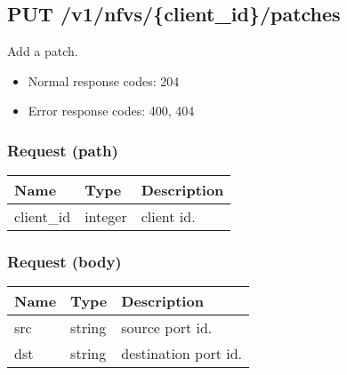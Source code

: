 \documentclass[a4paper,11pt,openany,oneside,english]{sphinxmanual}
\begin{document}
\subsection{PUT /v1/nfvs/\{client\_id\}/patches}
\label{\detokenize{api_ref/spp_nfv:put-v1-nfvs-client-id-patches}}
Add a patch.
\begin{itemize}
\item {} 
Normal response codes: 204

\item {} 
Error response codes: 400, 404

\end{itemize}


\subsubsection{Request (path)}
\label{\detokenize{api_ref/spp_nfv:id10}}

\begin{savenotes}\sphinxattablestart
\centering
{}
\sphinxthecaptionisattop
{}\label{\detokenize{api_ref/spp_nfv:id30}}\label{\detokenize{api_ref/spp_nfv:table-spp-ctl-spp-nfv-patches-get}}
\sphinxaftertopcaption
\begin{tabulary}{\linewidth}[t]{|T|T|T|}
\hline
\sphinxstyletheadfamily 
Name
&\sphinxstyletheadfamily 
Type
&\sphinxstyletheadfamily 
Description
\\
\hline
client\_id
&
integer
&
client id.
\\
\hline
\end{tabulary}
\par
\sphinxattableend\end{savenotes}


\subsubsection{Request (body)}
\label{\detokenize{api_ref/spp_nfv:id11}}

\begin{savenotes}\sphinxattablestart
\centering
{}
\sphinxthecaptionisattop
{}\label{\detokenize{api_ref/spp_nfv:id31}}\label{\detokenize{api_ref/spp_nfv:table-spp-ctl-spp-nfv-ports-patches-body}}
\sphinxaftertopcaption
\begin{tabulary}{\linewidth}[t]{|T|T|T|}
\hline
\sphinxstyletheadfamily 
Name
&\sphinxstyletheadfamily 
Type
&\sphinxstyletheadfamily 
Description
\\
\hline
src
&
string
&
source port id.
\\
\hline
dst
&
string
&
destination port id.
\\
\hline
\end{tabulary}
\par
\sphinxattableend\end{savenotes}
\end{document}
